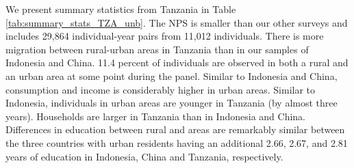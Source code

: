 We present summary statistics from Tanzania in Table \ref{tab:summary_stats_TZA_unb}. The NPS is smaller than our other surveys and includes 29,864 individual-year pairs from 11,012 individuals. There is more migration between rural-urban areas in Tanzania than in our samples of Indonesia and China. 11.4 percent of individuals are observed in both a rural and an urban area at some point during the panel.  Similar to Indonesia and China, consumption and income is considerably higher in urban areas. Similar to Indonesia, individuals in urban areas are younger in Tanzania (by almost three years). Households are larger in Tanzania than in Indonesia and China. Differences in education between rural and areas are remarkably similar between the three countries with urban residents having an additional 2.66, 2.67, and 2.81 years of education in Indonesia, China and Tanzania, respectively.





